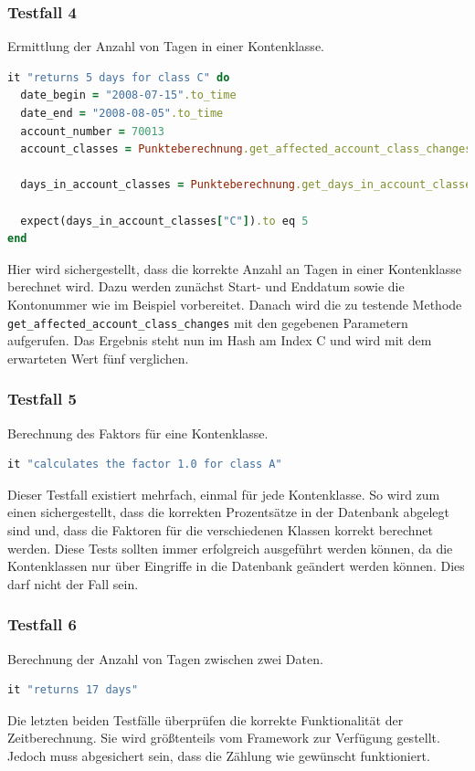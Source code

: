 \documentclass[12pt]{scrreprt}
\begin{document}
\subsubsection{Testfall 4}
Ermittlung der Anzahl von Tagen in einer Kontenklasse.
\begin{lstlisting}[language=Ruby]
it "returns 5 days for class C" do
  date_begin = "2008-07-15".to_time
  date_end = "2008-08-05".to_time
  account_number = 70013
  account_classes = Punkteberechnung.get_affected_account_class_changes(date_begin, date_end, account_number)
  
  days_in_account_classes = Punkteberechnung.get_days_in_account_classes(account_classes, date_begin, date_end)
  
  expect(days_in_account_classes["C"]).to eq 5
end 
\end{lstlisting}
Hier wird sichergestellt, dass die korrekte Anzahl an Tagen in einer Kontenklasse berechnet wird. Dazu werden zunächst Start- und Enddatum sowie die Kontonummer wie im Beispiel vorbereitet. Danach wird die zu testende Methode \newline\verb+get_affected_account_class_changes+ mit den gegebenen Parametern aufgerufen. Das Ergebnis steht nun im Hash am Index C und wird mit dem erwarteten Wert fünf verglichen.

\subsubsection{Testfall 5}
Berechnung des Faktors für eine Kontenklasse.
\begin{lstlisting}[language=Ruby]
it "calculates the factor 1.0 for class A"
\end{lstlisting}
Dieser Testfall existiert mehrfach, einmal für jede Kontenklasse. So wird zum einen sichergestellt, dass die korrekten Prozentsätze in der Datenbank abgelegt sind und, dass die Faktoren für die verschiedenen Klassen korrekt berechnet werden. Diese Tests sollten immer erfolgreich ausgeführt werden können, da die Kontenklassen nur über Eingriffe in die Datenbank geändert werden können. Dies darf nicht der Fall sein. 

\subsubsection{Testfall 6}
Berechnung der Anzahl von Tagen zwischen zwei Daten.
\begin{lstlisting}[language=Ruby]
it "returns 17 days"
\end{lstlisting}
Die letzten beiden Testfälle überprüfen die korrekte Funktionalität der Zeitberechnung. Sie wird größtenteils vom Framework zur Verfügung gestellt. Jedoch muss abgesichert sein, dass die Zählung wie gewünscht funktioniert.
\end{document}
